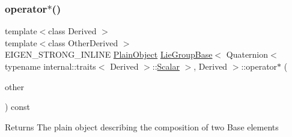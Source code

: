 \subsubsection{\texorpdfstring{operator$\ast$()}{operator*()}\hspace{0.1cm}{\footnotesize\ttfamily [1/3]}}
{\footnotesize\ttfamily template$<$class Derived $>$ \\
template$<$class Other\+Derived $>$ \\
E\+I\+G\+E\+N\+\_\+\+S\+T\+R\+O\+N\+G\+\_\+\+I\+N\+L\+I\+NE \hyperlink{class_lie_group_base_3_01_quaternion_3_01typename_01internal_1_1traits_3_01_derived_01_4_1_1_scalar_01_4_00_01_derived_01_4_aadda973938291d3ccd25e606c6333a27}{Plain\+Object} \hyperlink{class_lie_group_base}{Lie\+Group\+Base}$<$ Quaternion$<$ typename internal\+::traits$<$ Derived $>$\+::\hyperlink{class_lie_group_base_3_01_quaternion_3_01typename_01internal_1_1traits_3_01_derived_01_4_1_1_scalar_01_4_00_01_derived_01_4_afadeceb3b98e52deecc572e71efb82a8}{Scalar} $>$, Derived $>$\+::operator$\ast$ (\begin{DoxyParamCaption}\item[{const \hyperlink{class_lie_group_base}{Lie\+Group\+Base}$<$ \hyperlink{class_lie_group_base_3_01_quaternion_3_01typename_01internal_1_1traits_3_01_derived_01_4_1_1_scalar_01_4_00_01_derived_01_4_a1a65624391a6a8eb63eb312f919c4855}{Base\+Type}, Other\+Derived $>$ \&}]{other }\end{DoxyParamCaption}) const}

\begin{DoxyReturn}{Returns}
The plain object describing the composition of two Base elements 
\end{DoxyReturn}
\hypertarget{class_lie_group_base_3_01_quaternion_3_01typename_01internal_1_1traits_3_01_derived_01_4_1_1_scalar_01_4_00_01_derived_01_4_acb8d7d01cc37f10c72eb76b65754b46a}{}\label{class_lie_group_base_3_01_quaternion_3_01typename_01internal_1_1traits_3_01_derived_01_4_1_1_scalar_01_4_00_01_derived_01_4_acb8d7d01cc37f10c72eb76b65754b46a} 
